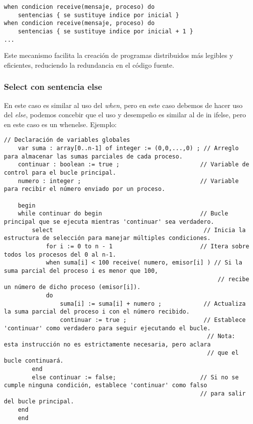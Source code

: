 \documentclass[a4paper,12pt]{article}
\begin{document}
\begin{lstlisting}[style=customcpp]
when condicion receive(mensaje, proceso) do
    sentencias { se sustituye indice por inicial }
when condicion receive(mensaje, proceso) do
    sentencias { se sustituye indice por inicial + 1 }
...
\end{lstlisting}

Este mecanismo facilita la creación de programas distribuidos más legibles y eficientes, reduciendo la redundancia en el código fuente.


\subsubsection{Select con sentencia else}

En este caso es similar al uso del \textit{when}, pero en este caso debemos de hacer uso del \textit{else}, podemos concebir que el uso y desempeño es similar al de in if\-else, pero en este caso es un when\-else. Ejemplo:
\begin{lstlisting}[style=customcpp, caption={Select con sentencia else}, label={lst:select-else}]
    // Declaración de variables globales
    var suma : array[0..n-1] of integer := (0,0,...,0) ; // Arreglo para almacenar las sumas parciales de cada proceso.
    continuar : boolean := true ;                       // Variable de control para el bucle principal.
    numero : integer ;                                  // Variable para recibir el número enviado por un proceso.
    
    begin
    while continuar do begin                            // Bucle principal que se ejecuta mientras 'continuar' sea verdadero.
        select                                           // Inicia la estructura de selección para manejar múltiples condiciones.
            for i := 0 to n - 1                         // Itera sobre todos los procesos del 0 al n-1.
            when suma[i] < 100 receive( numero, emisor[i] ) // Si la suma parcial del proceso i es menor que 100,
                                                             // recibe un número de dicho proceso (emisor[i]).
            do
                suma[i] := suma[i] + numero ;            // Actualiza la suma parcial del proceso i con el número recibido.
                continuar := true ;                      // Establece 'continuar' como verdadero para seguir ejecutando el bucle.
                                                          // Nota: esta instrucción no es estrictamente necesaria, pero aclara
                                                          // que el bucle continuará.
        end
        else continuar := false;                        // Si no se cumple ninguna condición, establece 'continuar' como falso
                                                        // para salir del bucle principal.
    end
    end
\end{lstlisting}
    
\end{document}

